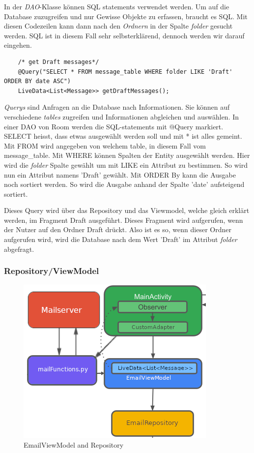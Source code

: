 \documentclass[a4paper,11pt]{article}
\begin{document}
In der \textit{DAO}-Klasse können SQL statements verwendet werden. Um auf die Database zuzugreifen und nur Gewisse 
Objekte zu erfassen, braucht es SQL. Mit diesen Codezeilen kann dann nach den \textit{Ordnern} in der Spalte \textit{folder} gesucht werden.
SQL ist in diesem Fall sehr selbsterklärend, 
dennoch werden wir darauf eingehen.\\

\lstset{language=SQL}
\begin{lstlisting}
    /* get Draft messages*/
    @Query("SELECT * FROM message_table WHERE folder LIKE 'Draft' ORDER BY date ASC")
    LiveData<List<Message>> getDraftMessages();
\end{lstlisting}

\textit{Querys} sind Anfragen an die Database nach Informationen. Sie können auf verschiedene \textit{tables} zugreifen und Informationen abgleichen und auswählen. 
In einer DAO von Room werden die SQL-statements mit @Query markiert. SELECT heisst, dass etwas ausgewählt werden soll und mit * ist alles gemeint. Mit FROM wird angegeben von 
welchem table, in diesem Fall vom message\_table. Mit WHERE können Spalten der Entity ausgewählt werden. Hier wird die \textit{folder} Spalte 
gewählt um mit LIKE ein Attribut zu bestimmen. So wird nun ein Attribut namens 'Draft' gewählt. Mit ORDER By kann die Ausgabe noch sortiert werden. So wird die Ausgabe anhand der Spalte 'date'
aufsteigend sortiert. \cite{queryExpl}

Dieses Query wird über das Repository und das Viewmodel, welche gleich erklärt werden, im Fragment Draft ausgeführt. Dieses Fragment wird aufgerufen, wenn der Nutzer 
auf den Ordner Draft drückt. Also ist es so, wenn dieser Ordner aufgerufen wird, wird die Database nach dem Wert 'Draft' im Attribut \textit{folder} abgefragt.

\subsubsection{Repository/ViewModel}

\begingroup
\setlength{\intextsep}{1pt}
\setlength{\columnsep}{4pt}

\begin{figure}
    \centering
    \includegraphics[width=.4\textwidth]{media/RepositoryDataInput.png}
    \caption{EmailViewModel and Repository
    \cite{appStructurePicture}}
\end{figure}
\end{document}
